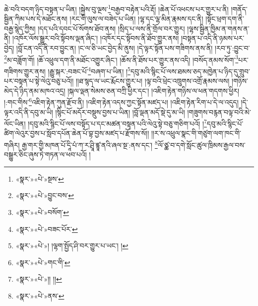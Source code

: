 ཆེ་བའི་བདག་ཉིད་བསྟན་པ་ཡིན། །སྐྱེས་བུ་ལྔས་\footnote{«སྣར་»«པེ་»སྔས་}བརྒྱབ་བརྟེན་པའི་རྡོ། །ཆེན་པོ་འཕངས་པར་གྱུར་པ་ནི། །གནོད་སྦྱིན་ཀིམ་པས་དེ་མཐོང་ནས། །རང་གི་ལུས་ལ་བཟེད་པ་ཡིན། །ལྷ་དང་ལྷ་མིན་རྣམས་དང་ནི། །སྟོང་ཕྲག་དག་ནི་བརྒྱ་སྙེད་ཀྱིས། །དད་པའི་དབང་པོ་སོགས་ཐོབ་ནས། །སྲིད་པ་ལས་ནི་གྲོལ་བར་གྱུར། །ལྷས་སྦྱིན་ཁྱིམ་ན་གནས་ན་ནི། །འཁོར་ལོས་སྒྱུར་བའི་སྟོབས་ལྡན་ཞིང་། །འཁོར་དང་སྟོབས་ནི་ཐོབ་གྱུར་ནས། །བསྟན་པ་འདི་ནི་ཉམས་པར་བྱེད། །བློ་ངན་འདི་ནི་རབ་བྱུང་ན། །ང་ལ་ཅི་ཡང་བྱེད་མི་ནུས། །དེ་ལྟར་སྟོན་པས་གཟིགས་ནས་ནི། །རབ་ཏུ་:བྱུང་བ་\footnote{«སྣར་»«པེ་»བྱུང་བས་}མ་བཟློག་གོ། །ཆོ་འཕྲུལ་དག་ནི་མཐོང་འགྱུར་ཞིང་། །ཆོས་ནི་ཐོས་པར་གྱུར་ནས་འདི། །བསོད་ནམས་སོག་\footnote{«སྣར་»«པེ་»བསོག་}པར་གཟིགས་གྱུར་ནས། །རྒྱུ་སྐར་:བཟང་པོ་\footnote{«སྣར་»«པེ་»བཟང་པོར་}བཞག་པ་ཡིན། །\footnote{«སྣར་»«པེ་»། །ལྷག་སྤྱོད་ཤི་བར་གྱུར་པ་ཡང་། །}དབུ་མའི་སྙིང་པོ་ལས་ཐམས་ཅད་མཁྱེན་པ་ཉིད་དུ་གྲུབ་པར་བསྟན་པ་སྟེ་ལེའུ་བཅུ་པའོ།། །།ཐ་སྙད་ལ་ཡང་རྨོངས་གྱུར་པ། །ལྟ་བའི་ཕྲེང་འཁྲུགས་འགྲོ་རྣམས་ལས། །གཉིས་མེད་དེ་ཉིད་ནམ་མཁའ་འདྲ། །སྐལ་ལྡན་སེམས་ཅན་བཀྲི་ཕྱིར་དང་། །འཇིག་རྟེན་གཉིས་ལ་ཕན་གདགས་ཕྱིར། །:གང་གིས་\footnote{«སྣར་»«པེ་»གང་གི་}འཇིག་རྟེན་ཀུན་རྫོབ་ནི། །འཇིག་རྟེན་འདས་ཀྱང་སྟོན་མཛད་པ། །འཇིག་རྟེན་རིག་པ་དེ་ལ་འདུད། །དེ་ལྟར་འདི་ནི་དབུ་མ་ཡི། །སྙིང་པོ་མདོར་བསྡུས་བྱས་པ་ཡིན། །བློ་ལྡན་མདོ་སྡེ་དུ་མ་ཡི། །གཟུགས་བརྙན་བལྟ་བའི་མེ་ལོང་ཡིན། །དབུ་མའི་སྙིང་པོ་ལས་བསྟོད་པ་དང་མཚན་བསྟན་པའི་ལེའུ་སྟེ་བཅུ་གཅིག་པའོ། །\footnote{«སྣར་»«པེ་»།། །།}དབུ་མའི་སྙིང་པོ་ཚིག་ལེའུར་བྱས་པ་སློབ་དཔོན་ཆེན་པོ་བྷ་བྱས་མཛད་པ་རྫོགས་སོ།། །།ར་ས་འཕྲུལ་སྣང་གི་གཙུག་ལག་ཁང་གི་གཞིར། རྒྱ་གར་གྱི་མཁན་པོ་དཱི་པཾ་ཀ་ར་ཤྲཱི་ཛྙཱ་ནའི་ཞལ་སྔ་:ནས་དང་། \footnote{«སྣར་»«པེ་»ནས་}ལོ་ཙྪ་བ་དགེ་སློང་ཚུལ་ཁྲིམས་རྒྱལ་བས་བསྒྱུར་ཅིང་ཞུས་ཏེ་གཏན་ལ་ཕབ་པའོ། ། 